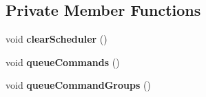 \subsection*{Private Member Functions}
\begin{DoxyCompactItemize}
\item 
\mbox{\label{classlib_iterative_robot_1_1_event_scheduler_a92692ad8573d974bae62c62fccf808c4}} 
void {\bfseries clear\+Scheduler} ()
\item 
\mbox{\label{classlib_iterative_robot_1_1_event_scheduler_a0334c1b83511053b6da8583caf6b87be}} 
void {\bfseries queue\+Commands} ()
\item 
\mbox{\label{classlib_iterative_robot_1_1_event_scheduler_a4df12d213a4ea996c942fdf1b85033b1}} 
void {\bfseries queue\+Command\+Groups} ()
\end{DoxyCompactItemize}
